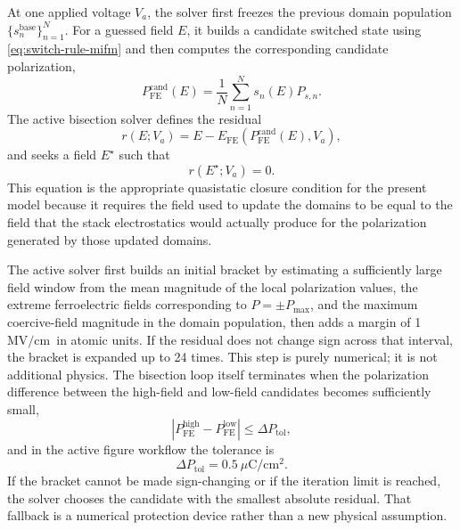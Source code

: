 \documentclass[11pt]{article}
\newcommand{\uc}{\ensuremath{\mu\text{C}/\text{cm}^2}}
\newcommand{\mvcm}{\ensuremath{\text{MV}/\text{cm}}}
\begin{document}
At one applied voltage $V_a$, the solver first freezes the previous domain
population $\{s_n^{\mathrm{base}}\}_{n=1}^{N}$. For a guessed field $E$, it
builds a candidate switched state using
\eqref{eq:switch-rule-mifm} and then computes the corresponding candidate
polarization,
\begin{equation}
P_{\mathrm{FE}}^{\mathrm{cand}}(E) =
\frac{1}{N}\sum_{n=1}^{N} s_n(E) P_{s,n}.
\label{eq:candidate-p-mifm}
\end{equation}
The active bisection solver defines the residual
\begin{equation}
r(E;V_a) =
E - E_{\mathrm{FE}}\!\left(P_{\mathrm{FE}}^{\mathrm{cand}}(E), V_a\right),
\label{eq:residual-mifm}
\end{equation}
and seeks a field $E^\star$ such that
\begin{equation}
r(E^\star;V_a) = 0.
\label{eq:fixed-point-mifm}
\end{equation}
This equation is the appropriate quasistatic closure condition for the present
model because it requires the field used to update the domains to be equal to
the field that the stack electrostatics would actually produce for the
polarization generated by those updated domains.

The active solver first builds an initial bracket by estimating a sufficiently
large field window from the mean magnitude of the local polarization values,
the extreme ferroelectric fields corresponding to $P=\pm P_{\max}$, and the
maximum coercive-field magnitude in the domain population, then adds a margin
of 1\,\mvcm\ in atomic units. If the residual does not change sign across that
interval, the bracket is expanded up to 24 times. This step is purely
numerical; it is not additional physics. The bisection loop itself terminates
when the polarization difference between the high-field and low-field
candidates becomes sufficiently small,
\begin{equation}
\left|
P_{\mathrm{FE}}^{\mathrm{high}} - P_{\mathrm{FE}}^{\mathrm{low}}
\right|
\le \Delta P_{\mathrm{tol}},
\label{eq:ptol-mifm}
\end{equation}
and in the active figure workflow the tolerance is
\begin{equation}
\Delta P_{\mathrm{tol}} = 0.5 \ \uc.
\label{eq:ptol-active-mifm}
\end{equation}
If the bracket cannot be made sign-changing or if the iteration limit is
reached, the solver chooses the candidate with the smallest absolute residual.
That fallback is a numerical protection device rather than a new physical
assumption.
\end{document}
